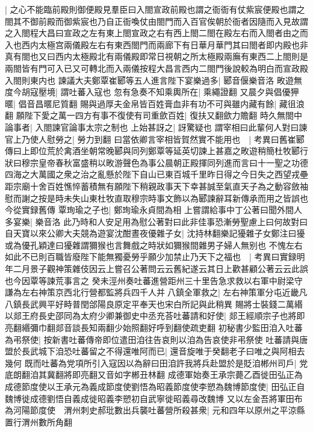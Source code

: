 |{
	之心不能臨前殿則御便殿見羣臣曰入閤宣政前殿也謂之衙衙有仗紫宸便殿也謂之閤其不御前殿而御紫宸也乃自正衙喚仗由閤門而入百官俟朝於衙者因隨而入見故謂之入閤程大昌曰宣政之左有東上閤宣政之右有西上閤二閤在殿左右而入閤者由之而入也西内太極宫兩儀殿左右有東西閤門而兩廊下有日華月華門其曰閤者即内殿也非真有閤也又曰西内太極殿北有兩儀殿即常日視朝之所太極殿兩廡有東西二上閤則是兩閤皆有門可入已又可轉北而入兩儀按程大昌言西内二閤門後說較為明白而宣政殿入閤則東内也}
諫議大夫鄭覃崔郾等五人進言陛下宴樂過多|{
	郾音偃樂音洛}
畋遊無度今胡寇壓境|{
	謂吐蕃入寇也}
忽有急奏不知乘輿所在|{
	乘繩證翻}
又晨夕與倡優狎暱|{
	倡音昌暱尼質翻}
賜與過厚夫金帛皆百姓膏血非有功不可與雖内藏有餘|{
	藏徂浪翻}
願陛下愛之萬一四方有事不復使有司重歛百姓|{
	復扶又翻歛力贍翻}
時久無閤中論事者|{
	入閤諫官論事太宗之制也}
上始甚訝之|{
	訝驚疑也}
謂宰相曰此輩何人對曰諫官上乃使人慰勞之|{
	勞力到翻}
曰當依卿言宰相皆賀然實不能用也　|{
	考異曰舊崔郾傳曰上即位荒於禽酒坐朝常晚郾與同列鄭覃等延英切諫上甚嘉之畋遊稍簡杜牧郾行狀曰穆宗皇帝春秋富盛稍以畋游聲色為事公晨朝正殿揮同列進而言曰十一聖之功德四海之大萬國之衆之治之亂懸於陛下自山已東百城千里昨日得之今日失之西望戎壘距宗廟十舍百姓憔悴蓄積無有願陛下稍親政事天下幸甚誠至氣直天子為之動容斂袖慰而謝之按是時未失山東杜牧直取穆宗時事文飾以為郾諫辭耳新傳承而用之皆誤也今從實録舊傳}
覃珣瑜之子也|{
	鄭珣瑜永貞間為相}
上嘗謂給事中丁公著曰聞外間人多宴樂|{
	樂音洛}
此乃時和人安足用為慰公著對曰此非佳事恐漸勞聖慮上曰何故對曰自天寶以來公卿大夫競為遊宴沈酣晝夜優雜子女|{
	沈持林翻樂記獶雜子女鄭注曰獶或為優孔穎達曰獶雜謂獮猴也言舞戲之時狀如獮猴間雜男子婦人無别也}
不愧左右如此不已則百職皆廢陛下能無獨憂勞乎願少加禁止乃天下之福也　|{
	考異曰實録明年二月景子觀神策雜伎因云上嘗召公著問云云舊紀遂云其日上歡甚顧公著云云此誤也今因覃等諫荒事言之}
癸未涇州奏吐蕃進營距州三十里告急求救以右軍中尉梁守謙為左右神策京西北行營都監將兵四千人并八鎮全軍救之|{
	左右神策軍分屯近畿凡八鎮長武興平好畤普閏郃陽良原定平奉天也宋白所記與此稍異}
賜將士裝錢二萬緡以郯王府長史邵同為太府少卿兼御史中丞充荅吐蕃請和好使|{
	郯王經順宗子也將即亮翻緡彌巾翻郯音談長知兩翻少始照翻好呼到翻使疏吏翻}
初秘書少監田洎入吐蕃為弔祭使|{
	按新書吐蕃傳帝即位遣田洎往告哀則以洎為告哀使非弔祭使}
吐蕃請與唐盟於長武城下洎恐吐蕃留之不得還唯阿而已|{
	還音旋唯于癸翻老子曰唯之與阿相去幾何}
既而吐蕃為党項所引入寇因以為辭曰田洎許我將兵赴盟於是貶洎郴州司戶|{
	党底朗翻洎其冀翻將即亮翻又音如字郴丑林翻}
成德軍始奏王承宗薨乙酉徙田弘正為成德節度使以王承元為義成節度使劉悟為昭義節度使李愬為魏博節度使|{
	田弘正自魏博徙成德劉悟自義成徙昭義李愬初自武寧徙昭義尋改魏博}
又以左金吾將軍田布為河陽節度使　渭州刺史郝玭數出兵襲吐蕃營所殺甚衆|{
	元和四年以原州之平涼縣置行渭州數所角翻}

